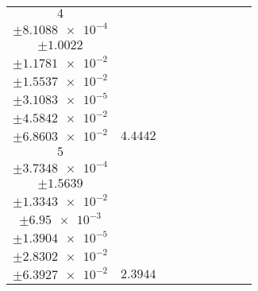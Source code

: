 \documentclass[8pt]{article}
\begin{document}
\begin{longtable}[l]{c c c c c c c c c}
$\num{4}$ & \begin{tabular}[c]{@{}c@{}}$\num{7.0232e-2}$ \\ $\pm\num{8.1088e-4}$\end{tabular} & \begin{tabular}[c]{@{}c@{}}$\num{-8.1009}$ \\ $\pm\num{1.0022}$\end{tabular} & \begin{tabular}[c]{@{}c@{}}$\num{1.0021}$ \\ $\pm\num{1.1781e-2}$\end{tabular} & \begin{tabular}[c]{@{}c@{}}$\num{2.9577e+3}$ \\ $\pm\num{1.5537e-2}$\end{tabular} & \begin{tabular}[c]{@{}c@{}}$\num{5.917}$ \\ $\pm\num{3.1083e-5}$\end{tabular} & \begin{tabular}[c]{@{}c@{}}$\num{4.3936}$ \\ $\pm\num{4.5842e-2}$\end{tabular} & \begin{tabular}[c]{@{}c@{}}$\num{6.9371}$ \\ $\pm\num{6.8603e-2}$\end{tabular} & $\num{4.4442}$\\
$\num{5}$ & \begin{tabular}[c]{@{}c@{}}$\num{3.3131e-2}$ \\ $\pm\num{3.7348e-4}$\end{tabular} & \begin{tabular}[c]{@{}c@{}}$\num{3.0082}$ \\ $\pm\num{1.5639}$\end{tabular} & \begin{tabular}[c]{@{}c@{}}$\num{5.6382}$ \\ $\pm\num{1.3343e-2}$\end{tabular} & \begin{tabular}[c]{@{}c@{}}$\num{2.9623e+3}$ \\ $\pm\num{6.95e-3}$\end{tabular} & \begin{tabular}[c]{@{}c@{}}$\num{5.9263}$ \\ $\pm\num{1.3904e-5}$\end{tabular} & \begin{tabular}[c]{@{}c@{}}$\num{2.6329}$ \\ $\pm\num{2.8302e-2}$\end{tabular} & \begin{tabular}[c]{@{}c@{}}$\num{4.8267}$ \\ $\pm\num{6.3927e-2}$\end{tabular} & $\num{2.3944}$\\

\end{longtable}
\end{document}
